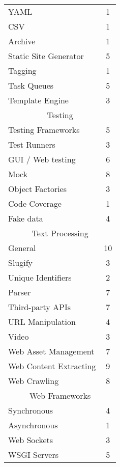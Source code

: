 \begin{longtable} {|l|c|}
    YAML & 1\\
    CSV & 1\\
    Archive & 1\\
    \hline
    Static Site Generator & 5\\
    \hline
    Tagging & 1\\
    \hline
    Task Queues & 5\\
    \hline
    Template Engine & 3\\
    \hline
    \multicolumn{2}{|c|}{Testing}\\
    \hline
    Testing Frameworks & 5\\
    Test Runners & 3\\
    GUI / Web testing & 6\\
    Mock & 8\\
    Object Factories & 3\\
    Code Coverage & 1\\
    Fake data & 4\\
    \hline
    \multicolumn{2}{|c|}{Text Processing}\\
    \hline
    General & 10\\
    Slugify & 3\\
    Unique Identifiers & 2\\
    Parser & 7\\
    \hline
    Third-party APIs & 7\\
    \hline
    URL Manipulation & 4\\
    \hline
    Video & 3\\
    \hline
    Web Asset Management & 7\\
    \hline
    Web Content Extracting & 9\\
    \hline
    Web Crawling & 8\\
    \hline
    \multicolumn{2}{|c|}{Web Frameworks}\\
    \hline
    Synchronous & 4\\
    Asynchronous & 1\\
    \hline
    Web Sockets & 3\\
    \hline
    WSGI Servers & 5\\
    \hline
\end{longtable}
